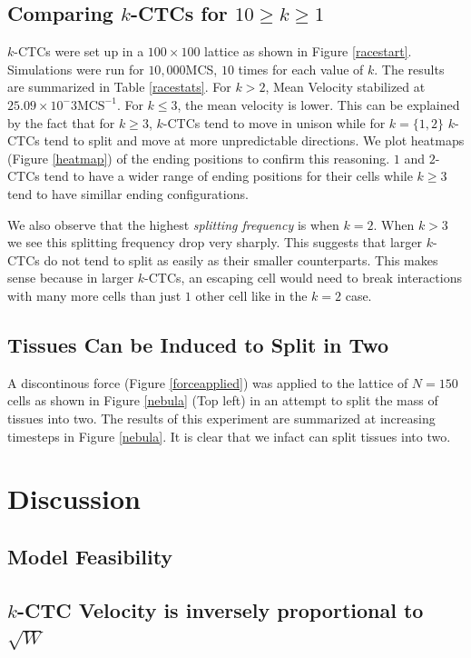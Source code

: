 \documentclass[12pt]{article}
\begin{document}
\subsection{Comparing $k$-CTCs for $10 \geq k\geq1$} %
$k$-CTCs were set up in a $100\times100$ lattice as shown in Figure \ref{racestart}. Simulations were run for $10,000$MCS, $10$ times for each value of $k$. The results are summarized in Table \ref{racestats}. For $k>2$, Mean Velocity stabilized at $25.09\times10^-3\text{MCS}^{-1}$. For $k\leq3$, the mean velocity is lower. This can be explained by the fact that for $k\geq3$, $k$-CTCs tend to move in unison while for $k=\{1,2\}$ $k$-CTCs tend to split and move at more unpredictable directions. We plot heatmaps (Figure \ref{heatmap}) of the ending positions to confirm this reasoning. $1$ and $2$-CTCs tend to have a wider range of ending positions for their cells while $k\geq3$ tend to have simillar ending configurations.

We also observe that the highest \emph{splitting frequency} is when $k=2$. When $k>3$ we see this splitting frequency drop very sharply. This suggests that larger $k$-CTCs do not tend to split as easily as their smaller counterparts. This makes sense because in larger $k$-CTCs, an escaping cell would need to break interactions with many more cells than just $1$ other cell like in the $k=2$ case.

\subsection{Tissues Can be Induced to Split in Two}
A discontinous force (Figure \ref{forceapplied}) was applied to the lattice of $N=150$ cells as shown in Figure \ref{nebula} (Top left) in an attempt to split the mass of tissues into two. The results of this experiment are summarized at increasing timesteps in Figure \ref{nebula}. It is clear that we infact can split tissues into two.
\section{Discussion}

\subsection{Model Feasibility}

\subsection{$k$-CTC Velocity is inversely proportional to $\sqrt{W}$ }
\end{document}
